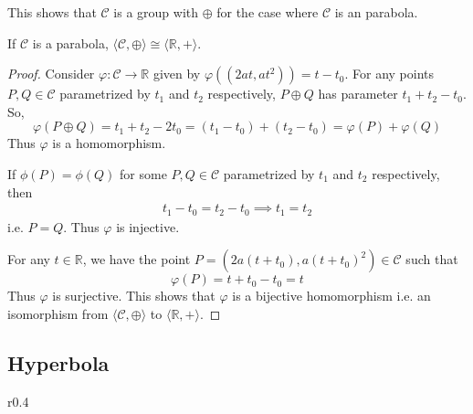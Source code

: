\noindent
This shows that $\mathcal{C}$ is a group with $\oplus$ for the case where $\mathcal{C}$ is an
parabola.

\begin{theorem}
    If $\mathcal{C}$ is a parabola,
    $\langle \mathcal{C},\oplus \rangle \cong \langle \mathbb{R},+ \rangle$.
\end{theorem}

\begin{proof}
    Consider $\varphi:\mathcal{C} \to \mathbb{R}$ given by
    $\varphi((2at,at^2)) = t - t_0$. For any points
    $P,Q\in\mathcal{C}$ parametrized by $t_1$ and $t_2$ respectively,
    $P \oplus Q$ has parameter $t_1 + t_2 - t_0$. So,
    \[
        \varphi(P \oplus Q) = t_1 + t_2 - 2t_0 = (t_1 - t_0) + (t_2 - t_0)
        = \varphi(P) + \varphi(Q)
    \]
    Thus $\varphi$ is a homomorphism.
    \vspace{1ex}

    \noindent
    If $\phi(P)=\phi(Q)$ for some $P,Q\in\mathcal{C}$ parametrized by $t_1$ and
    $t_2$ respectively, then
    \begin{align*}
        t_1 - t_0 = t_2 - t_0 \implies t_1 = t_2
    \end{align*}
    i.e. $P=Q$. Thus $\varphi$ is injective.
    \vspace{1ex}

    \noindent
    For any $t \in \mathbb{R}$, we have the point
    $P=(2a(t + t_0),a(t + t_0)^2) \in \mathcal{C}$ such that
    \[ \varphi(P) = t + t_0 - t_0 = t \]
    Thus $\varphi$ is surjective. This shows that $\varphi$ is a bijective
    homomorphism i.e. an isomorphism from $\langle \mathcal{C},\oplus \rangle$ to
    $\langle \mathbb{R},+ \rangle$.
\end{proof}

\pagebreak

\subsection*{Hyperbola}

\begin{wrapfigure}{r}{0.4\textwidth}
    \centering

    \caption{}
\end{wrapfigure}

